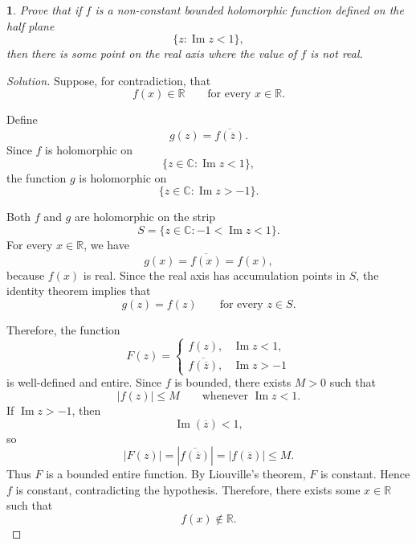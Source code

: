 \documentclass[12pt, a4paper]{report}
\theoremstyle{spaced}
\newtheorem{exercise}{}
\begin{document}
\begin{exercise}
	Prove that if $f$ is a non-constant bounded holomorphic function defined on the
	half plane
	\[
		\{z:\operatorname{Im} z<1\},
	\]
	then there is some point on the real axis where the value of $f$ is not real.
\end{exercise}
\begin{proof}[Solution]
	Suppose, for contradiction, that
	\[
		f(x)\in\mathbb{R}
		\qquad \text{for every } x\in\mathbb{R}.
	\]

	Define
	\[
		g(z)=\overline{f(\overline{z})}.
	\]
	Since \(f\) is holomorphic on
	\[
		\{z\in\mathbb{C}:\operatorname{Im}z<1\},
	\]
	the function \(g\) is holomorphic on
	\[
		\{z\in\mathbb{C}:\operatorname{Im}z>-1\}.
	\]

	Both \(f\) and \(g\) are holomorphic on the strip
	\[
		S=\{z\in\mathbb{C}:-1<\operatorname{Im}z<1\}.
	\]
	For every \(x\in\mathbb{R}\), we have
	\[
		g(x)=\overline{f(x)}=f(x),
	\]
	because \(f(x)\) is real. Since the real axis has accumulation points
	in \(S\), the identity theorem implies that
	\[
		g(z)=f(z)
		\qquad \text{for every } z\in S.
	\]

	Therefore, the function
	\[
		F(z)=
		\begin{cases}
			f(z),                       & \operatorname{Im}z<1, \\[4pt]
			\overline{f(\overline{z})}, & \operatorname{Im}z>-1
		\end{cases}
	\]
	is well-defined and entire.
	Since \(f\) is bounded, there exists \(M>0\) such that
	\[
		|f(z)|\leq M
		\qquad \text{whenever } \operatorname{Im}z<1.
	\]
	If \(\operatorname{Im}z>-1\), then
	\[
		\operatorname{Im}(\overline{z})<1,
	\]
	so
	\[
		|F(z)|
		=
		\left|\overline{f(\overline{z})}\right|
		=
		|f(\overline{z})|
		\leq M.
	\]
	Thus \(F\) is a bounded entire function. By Liouville's theorem,
	\(F\) is constant. Hence \(f\) is constant, contradicting the
	hypothesis.
	Therefore, there exists some \(x\in\mathbb{R}\) such that
	\[
		f(x)\notin\mathbb{R}.
	\]
\end{proof}
\end{document}

